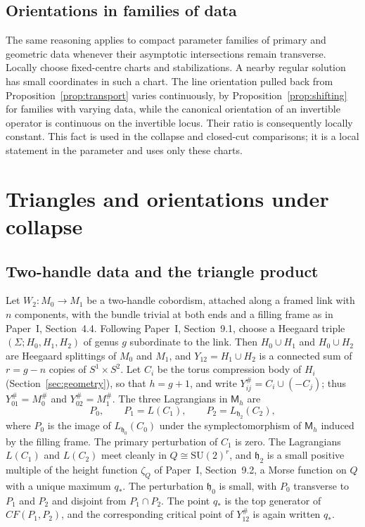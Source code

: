 \documentclass[11pt]{amsart}
\theoremstyle{definition}
\theoremstyle{remark}
\theoremstyle{plain}
\numberwithin{equation}{section}
\newcommand{\SU}{\mathrm{SU}}
\newcommand{\CF}{\mathit{CF}}
\newcommand{\Msf}{\mathsf M}
\begin{document}
\subsection{Orientations in families of data}
The same reasoning applies to compact parameter families
of primary and geometric data whenever their asymptotic
intersections remain transverse. Locally choose
fixed-centre charts and stabilizations. A nearby regular
solution has small coordinates in such a chart. The
line orientation pulled back from
Proposition~\ref{prop:transport} varies continuously, by
Proposition~\ref{prop:shifting} for families with varying data,
while the canonical orientation of an invertible
operator is continuous on the invertible locus. Their
ratio is consequently locally constant. This fact is used in the
collapse and closed-cut comparisons; it is a local statement in the
parameter and uses only these charts.

\section{Triangles and orientations under collapse}\label{sec:collapse}

\subsection{Two-handle data and the triangle product}\label{subsec:two-handle-data}
Let $W_2\colon M_0\to M_1$ be a two-handle cobordism, attached along a
framed link with $n$ components, with the bundle trivial at both ends and
a filling frame as in Paper~I, Section~4.4. Following Paper~I,
Section~9.1, choose a Heegaard triple $(\Sigma;H_0,H_1,H_2)$ of genus $g$
subordinate to the link. Then $H_0\cup H_1$ and $H_0\cup H_2$ are
Heegaard splittings of $M_0$ and $M_1$, and $Y_{12}=H_1\cup H_2$ is a
connected sum of $r=g-n$ copies of $S^1\times S^2$. Let $C_i$ be the
torus compression body of $H_i$ (Section~\ref{sec:geometry}), so that
$h=g+1$, and write $Y_{ij}^\#=C_i\cup(-C_j)$; thus $Y_{01}^\#=M_0^\#$ and
$Y_{02}^\#=M_1^\#$. The three Lagrangians in $\Msf_h$ are
\[
 P_0,\qquad P_1=L(C_1),\qquad P_2=L_{\mathfrak h_2}(C_2),
\]
where $P_0$ is the image of $L_{\mathfrak h_0}(C_0)$ under the
symplectomorphism of $\Msf_h$ induced by the filling frame. The primary
perturbation of $C_1$ is zero. The Lagrangians $L(C_1)$ and $L(C_2)$ meet
cleanly in $Q\cong\SU(2)^r$, and $\mathfrak h_2$ is a small positive
multiple of the height function $\zeta_Q$ of Paper~I, Section~9.2, a Morse
function on $Q$ with a unique maximum $q_*$. The perturbation
$\mathfrak h_0$ is small, with $P_0$ transverse to $P_1$ and $P_2$ and
disjoint from $P_1\cap P_2$. The point $q_*$ is the top generator of
$\CF(P_1,P_2)$, and the corresponding critical point of $Y_{12}^\#$ is
again written $q_*$.
\end{document}
